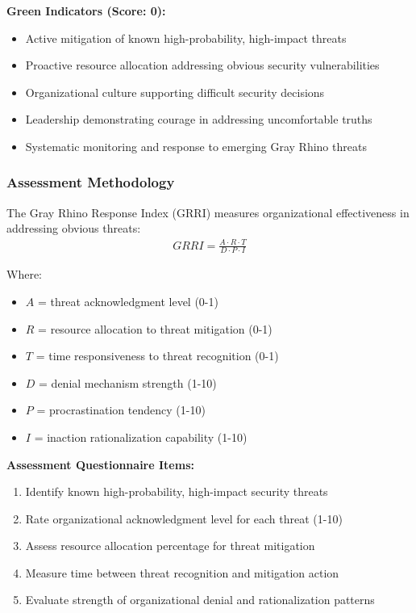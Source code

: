 \documentclass[11pt,a4paper]{article}
\begin{document}
\textbf{Green Indicators (Score: 0):}
\begin{itemize}
\item Active mitigation of known high-probability, high-impact threats
\item Proactive resource allocation addressing obvious security vulnerabilities
\item Organizational culture supporting difficult security decisions
\item Leadership demonstrating courage in addressing uncomfortable truths
\item Systematic monitoring and response to emerging Gray Rhino threats
\end{itemize}

\subsubsection{Assessment Methodology}

The Gray Rhino Response Index (GRRI) measures organizational effectiveness in addressing obvious threats:
\begin{align}
GRRI = \frac{A \cdot R \cdot T}{D \cdot P \cdot I}
\end{align}

Where:
\begin{itemize}
\item $A$ = threat acknowledgment level (0-1)
\item $R$ = resource allocation to threat mitigation (0-1)
\item $T$ = time responsiveness to threat recognition (0-1)
\item $D$ = denial mechanism strength (1-10)
\item $P$ = procrastination tendency (1-10)
\item $I$ = inaction rationalization capability (1-10)
\end{itemize}

\textbf{Assessment Questionnaire Items:}
\begin{enumerate}
\item Identify known high-probability, high-impact security threats
\item Rate organizational acknowledgment level for each threat (1-10)
\item Assess resource allocation percentage for threat mitigation
\item Measure time between threat recognition and mitigation action
\item Evaluate strength of organizational denial and rationalization patterns
\end{enumerate}
\end{document}
